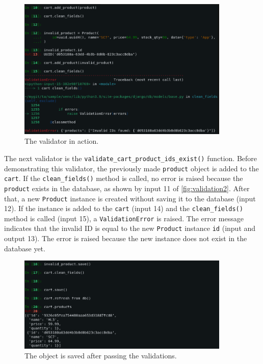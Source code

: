 \begin{figure}
	\centering
    \includegraphics[width=0.90\textwidth]{pics/validation2.png}
	\caption{The  validator in action.}
	\label{fig:validation2}
\end{figure}

The next validator is the \verb|validate_cart_product_ids_exist()| function.
Before demonstrating this validator, the previously made \verb|product| object
is added to the \verb|cart|. If the \verb|clean_fields()| method is called, no
error is raised because the \verb|product| exists in the database, as shown by
input 11 of \autoref{fig:validation2}. After that, a new \verb|Product|
instance is created without saving it to the database (input 12). If the
instance is added to the \verb|cart| (input 14) and the \verb|clean_fields()|
method is called (input 15), a \verb|ValidationError| is raised. The error
message indicates that the invalid ID is equal to the new \verb|Product|
instance \verb|id| (input and output 13). The error is raised because the
new instance does not exist in the database yet.

\begin{figure}
	\centering
    \includegraphics[width=0.90\textwidth]{pics/validation3.png}
	\caption{The  object is saved after passing the validations.}
	\label{fig:validation3}
\end{figure}

